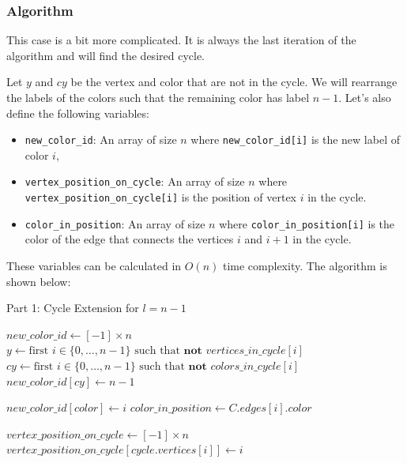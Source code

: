 \subsubsection{Algorithm}

This case is a bit more complicated. It is always the last iteration of the algorithm and will
find the desired cycle.

Let $y$ and $cy$ be the vertex and color that are not in the cycle. We will rearrange the labels
of the colors such that the remaining color has label $n - 1$. Let's also define the following variables:

\begin{itemize}
    \item \texttt{new\_color\_id}: An array of size \( n \) where \texttt{new\_color\_id[i]} is the new label of color \( i \),
    \item \texttt{vertex\_position\_on\_cycle}: An array of size \( n \) where \texttt{vertex\_position\_on\_cycle[i]} is the position of vertex \( i \) in the cycle.
    \item \texttt{color\_in\_position}: An array of size \( n \) where \texttt{color\_in\_position[i]} is the color of the edge that connects the vertices \( i \) and \( i + 1 \) in the cycle.
\end{itemize}

These variables can be calculated in \( O(n) \) time complexity. The algorithm is shown below:

\begin{algorithm}
    \caption{Part 1: Cycle Extension for \( l = n - 1 \)}
    \begin{algorithmic}
            \State $new\_color\_id \gets [-1] \times n$
            \State $y \gets \text{first } i \in \{0, \dots, n-1\} \text{ such that } \textbf{not } vertices\_in\_cycle[i]$
            \State $cy \gets \text{first } i \in \{0, \dots, n-1\} \text{ such that } \textbf{not } colors\_in\_cycle[i]$
            \State $new\_color\_id[cy] \gets n - 1$
            
                \State $new\_color\_id[color] \gets i$
                \State $color\_in\_position \gets C.edges[i].color$
            \EndFor
            
            \State $vertex\_position\_on\_cycle \gets [-1] \times n$
                \State $vertex\_position\_on\_cycle[cycle.vertices[i]] \gets i$
            \EndFor
        \EndFunction
    \end{algorithmic}
\end{algorithm}

